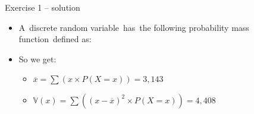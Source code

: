 \documentclass{beamer}
\begin{document}
\begin{frame}
{\centerline{Exercise 1 -- solution}}
\begin{itemize}
    \item A discrete random variable has the following probability mass function defined as:
    \newline
    \begin{center}

    \end{center}
    \newline
    
    \item So we get:
    \begin{itemize}
        \item $ \overline{x} = \sum (x \times P(X=x)) = 3,143 $
        \item $ \mathbb{V}(x) = \sum ((x - \overline{x})^{2} \times P(X=x)) = 4,408 $

    \end{itemize}

\end{itemize}
\end{frame}
\end{document}
